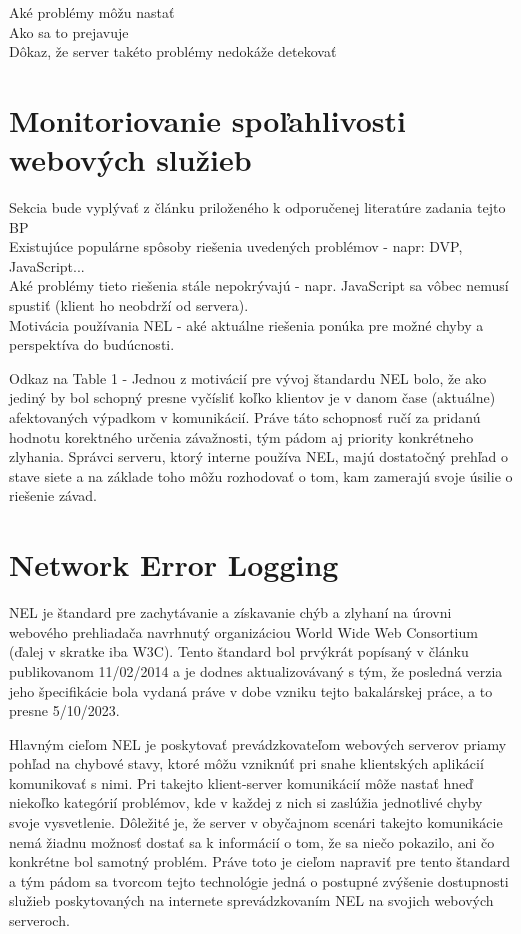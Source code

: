Aké problémy môžu nastať
\\
Ako sa to prejavuje
\\
Dôkaz, že server takéto problémy nedokáže detekovať

\section{Monitoriovanie spoľahlivosti webových služieb}

Sekcia bude vyplývať z článku priloženého k odporučenej literatúre zadania tejto BP \cite{nel-client-side-measurement-e2e-reliability}
\\
Existujúce populárne spôsoby riešenia uvedených problémov - napr: DVP, JavaScript...
\\
Aké problémy tieto riešenia stále nepokrývajú - napr. JavaScript sa vôbec nemusí spustiť (klient ho neobdrží od servera).
\\
Motivácia používania NEL - aké aktuálne riešenia ponúka pre možné chyby a perspektíva do budúcnosti.


Odkaz na Table 1 - Jednou z motivácií pre vývoj štandardu NEL bolo, že ako jediný by bol schopný presne vyčísliť koľko klientov je
v danom čase (aktuálne) afektovaných výpadkom v komunikácií. Práve táto schopnosť ručí za pridanú hodnotu korektného určenia závažnosti,
tým pádom aj priority konkrétneho zlyhania. Správci serveru, ktorý interne používa NEL, majú dostatočný prehľad o stave siete a na základe 
toho môžu rozhodovať o tom, kam zamerajú svoje úsilie o riešenie závad.    

\section{Network Error Logging}


NEL je štandard pre zachytávanie a získavanie chýb a zlyhaní na úrovni webového prehliadača navrhnutý organizáciou World Wide Web 
Consortium (ďalej v skratke iba W3C). Tento štandard bol prvýkrát popísaný v článku publikovanom 11/02/2014 a je dodnes aktualizovávaný
s tým, že posledná verzia jeho špecifikácie bola vydaná práve v dobe vzniku tejto bakalárskej práce, a to presne 5/10/2023. 

Hlavným cieľom NEL je poskytovať prevádzkovateľom webových serverov priamy pohľad na chybové stavy, ktoré môžu vzniknúť pri snahe 
klientských aplikácií komunikovať s nimi. Pri takejto klient-server komunikácií môže nastať hneď niekoľko kategórií problémov, 
kde v každej z nich si zaslúžia jednotlivé chyby svoje vysvetlenie. Dôležité je, že server v obyčajnom scenári takejto komunikácie 
nemá žiadnu možnosť dostať sa k informácií o tom, že sa niečo pokazilo, ani čo konkrétne bol samotný problém. Práve toto je cieľom 
napraviť pre tento štandard a tým pádom sa tvorcom tejto technológie jedná o postupné zvýšenie dostupnosti služieb poskytovaných 
na internete sprevádzkovaním NEL na svojich webových serveroch.

